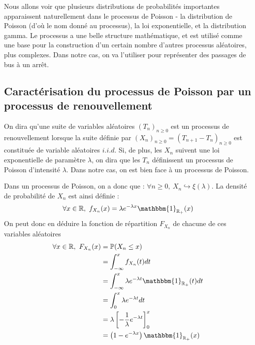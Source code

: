 \documentclass[a4paper, titlepage]{livret} %
\begin{document}
				Nous allons voir que plusieurs distributions de probabilités importantes apparaissent naturellement dans le processus de Poisson - la distribution de Poisson (d'où le nom donné au processus), la loi exponentielle, et la distribution gamma. 
				Le processus a une belle structure mathématique, et est utilisé comme une base pour la construction d'un certain nombre d'autres processus aléatoires, plus complexes.
				Dans notre cas, on va l'utiliser pour représenter des passages de bus à un arrêt.

			\subsection{Caractérisation du processus de Poisson par un processus de renouvellement}
				On dira qu'une suite de variables aléatoires $(T_{n})_{n \geq 0}$ est un processus de renouvellement lorsque la suite définie par $(X_{n})_{n \geq 0} = (T_{n+1} - T_{n})_{n \geq 0}$ est constituée de variable aléatoires $i.i.d$. 
				Si, de plus, les $X_{n}$ suivent une loi exponentielle de paramètre $\lambda$, on dira que les $T_{n}$ définissent un processus de Poisson d'\og intensité \fg{} $\lambda$.
				Dans notre cas, on est bien face à un processus de Poisson.

				Dans un processus de Poisson, on a donc que : $\forall n \geq 0, \ X_{n} \hookrightarrow \xi(\lambda)$.
				La densité de probabilité de $X_{n}$ est ainsi définie :
				\[
					\forall x \in \mathbb{R}, \ f_{X_{n}}(x) = \lambda e^{-\lambda x} \mathbbm{1}_{\mathbb{R}_{+}}(x)
				\]
				On peut donc en déduire la fonction de répartition $F_{X_{n}}$ de chacune de ces variables aléatoires
				\[\begin{aligned}
					\forall x \in \mathbb{R}, \ F_{X_{n}}(x) & = \mathbb{P}(X_{n} \leq x) \\
							     						     & = \int_{-\infty}^{x} f_{X_{n}}(t)dt\\
								 						     & = \int_{-\infty}^{x} \lambda e^{-\lambda t} \mathbbm{1}_{\mathbb{R}_{+}}(t)dt \\
								 						     & = \int_{0}^{x} \lambda e^{-\lambda t}dt \\
								 						     & = \lambda \left[-\frac{1}{\lambda} e^{-\lambda t}\right]_{0}^{x}\\
								 						     & = \left(1 - e^{-\lambda x}\right)\mathbbm{1}_{\mathbb{R}_{+}}(x)\\
				\end{aligned}\]
\end{document}
